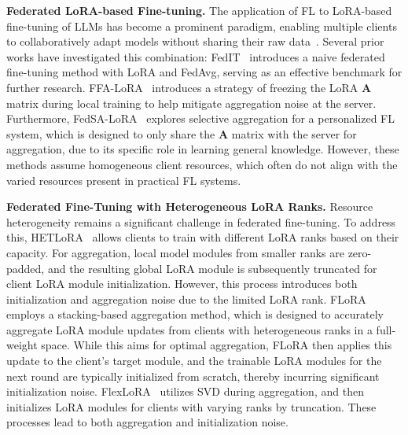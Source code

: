 \documentclass{article} %
\begin{document}
\textbf{Federated LoRA-based Fine-tuning.} The application of FL to LoRA-based fine-tuning of LLMs has become a prominent paradigm, enabling multiple clients to collaboratively adapt models without sharing their raw data~\cite{zhang2023towards, babakniya2023slora, sun2024improving,zhang2024federated}.
Several prior works have investigated this combination:
FedIT~\cite{zhang2023towards} introduces a naive federated fine-tuning method with LoRA and FedAvg, serving as an effective benchmark for further research. 
FFA-LoRA~\cite{sun2024improving} introduces a strategy of freezing the LoRA $\mathbf{A}$ matrix during local training to help mitigate aggregation noise at the server. Furthermore, FedSA-LoRA~\cite{guo2024selective} explores selective aggregation for a personalized FL system, which is designed to only share the $\mathbf{A}$ matrix with the server for aggregation, due to its specific role in learning general knowledge. However, these methods assume homogeneous client resources, which often do not align with the varied resources present in practical FL systems.

\noindent\textbf{Federated Fine-Tuning with Heterogeneous LoRA Ranks.} Resource heterogeneity remains a significant challenge in federated fine-tuning. To address this, HETLoRA~\cite{cho2024heterogeneous} allows clients to train with different LoRA ranks based on their capacity. For aggregation, local model modules from smaller ranks are zero-padded, and the resulting global LoRA module is subsequently truncated for client LoRA module initialization. However, this process introduces both initialization and aggregation noise due to the limited LoRA rank.
FLoRA~\cite{wangflora} employs a stacking-based aggregation method, which is designed to accurately aggregate LoRA module updates from clients with heterogeneous ranks in a full-weight space. While this aims for optimal aggregation, FLoRA then applies this update to the client's target module, and the trainable LoRA modules for the next round are typically initialized from scratch, thereby incurring significant initialization noise.
FlexLoRA~\cite{bai2024federated} utilizes SVD during aggregation, and then initializes LoRA modules for clients with varying ranks by truncation. These processes lead to both aggregation and initialization noise.
\end{document}
